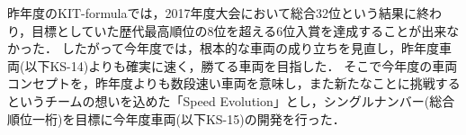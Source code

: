 昨年度のKIT-formulaでは，2017年度大会において総合32位という結果に終わり，目標としていた歴代最高順位の8位を超える6位入賞を達成することが出来なかった．
したがって今年度では，根本的な車両の成り立ちを見直し，昨年度車両(以下KS-14)よりも確実に速く，勝てる車両を目指した．
そこで今年度の車両コンセプトを，昨年度よりも数段速い車両を意味し，また新たなことに挑戦するというチームの想いを込めた「Speed Evolution」とし，シングルナンバー(総合順位一桁)を目標に今年度車両(以下KS-15)の開発を行った．
